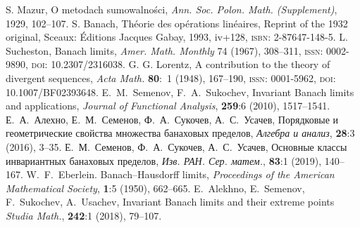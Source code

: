 \documentclass[a4paper,14pt]{article}
\begin{document}
	\small
	\begin{thebibliography}{99}
		{}
		S. Mazur, O metodach sumowalno\'sci,
		\emph{Ann. Soc. Polon. Math. (Supplement)}, 1929, 102--107.
		{}
		S. Banach, Th\'eorie des op\'erations lin\'eaires, Reprint of the 1932 original, Sceaux: \'Editions Jacques Gabay,
		1993, iv+128, \textsc{isbn}: 2-87647-148-5.
		{}
		L. Sucheston, Banach limits, \emph{Amer. Math. Monthly} 74 (1967), 308--311, \textsc{issn}: 0002-9890,
		\textsc{doi}: {10.2307/2316038}.
		{}
		G. G. Lorentz, A contribution to the theory of divergent sequences, \emph{Acta Math.} \textbf{80}:~{1}
		(1948), 167--190, \textsc{issn}: 0001-5962, \textsc{doi}: {10.1007/BF02393648}.
		{}
		E.~M.~Semenov, F.~A.~Sukochev, Invariant Banach limits
		and applications, {\it Journal of Functional Analysis}, {\bf 259}:6 (2010), 1517--1541.
		{}
		Е.~А.~Алехно, Е.~М.~Семенов, Ф.~А.~Сукочев, А.~С.~Усачев, Порядковые и геометрические
		свойства множества банаховых пределов, {\it Алгебра и анализ}, {\bf 28}:3 (2016), 3--35.
		{}
		Е.~М.~Семенов, Ф.~А.~Сукочев, А.~С.~Усачев, Основные классы
		инвариантных банаховых пределов, {\it Изв. РАН. Сер. матем.}, {\bf 83}:1 (2019), 140--167.
		{}
		W.~F.~Eberlein. Banach--Hausdorff limits, {\it Proceedings of the
		American Mathematical Society}, {\bf 1}:5 (1950), 662--665.
		{}
		E.~Alekhno, E.~Semenov, F.~Sukochev, A.~Usachev, Invariant Banach limits and their extreme points
		{\it Studia Math.}, {\bf 242}:1 (2018), 79--107.
	\end{thebibliography}
	\normalsize
\end{document}

